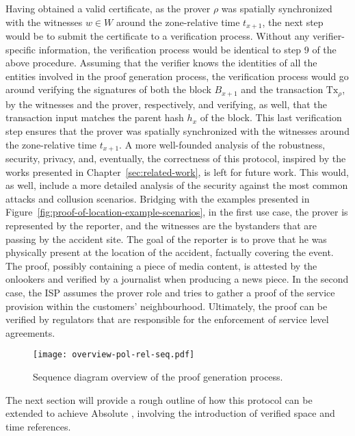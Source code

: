 Having obtained a valid \pol{} certificate, as the prover $\rho$ was spatially synchronized with the witnesses $w \in W$ around the zone-relative time $t_{x+1}$, the next step would be to submit the certificate to a verification process. Without any verifier-specific information, the verification process would be identical to step 9 of the above procedure. Assuming that the verifier knows the identities of all the entities involved in the proof generation process, the verification process would go around verifying the signatures of both the block $B_{x+1}$ and the transaction $\text{Tx}_\rho$, by the witnesses and the prover, respectively, and verifying, as well, that the transaction input matches the parent hash $h_{x}$ of the block. This last verification step ensures that the prover was spatially synchronized with the witnesses around the zone-relative time $t_{x+1}$. A more well-founded analysis of the robustness, security, privacy, and, eventually, the correctness of this \pol{} protocol, inspired by the works presented in Chapter~\ref{sec:related-work}, is left for future work. This would, as well, include a more detailed analysis of the security against the most common attacks and collusion scenarios. Bridging with the examples presented in Figure~\ref{fig:proof-of-location-example-scenarios}, in the first use case, the prover is represented by the reporter, and the witnesses are the bystanders that are passing by the accident site. The goal of the reporter is to prove that he was physically present at the location of the accident, factually covering the event. The proof, possibly containing a piece of media content, is attested by the onlookers and verified by a journalist when producing a news piece. In the second case, the ISP assumes the prover role and tries to gather a proof of the service provision within the customers' neighbourhood. Ultimately, the proof can be verified by regulators that are responsible for the enforcement of service level agreements.

\newpage  

\begin{figure}[h!]
    \begin{center}
    \texttt{[image: overview-pol-rel-seq.pdf]}
    \caption{Sequence diagram overview of the proof generation process.}
    \label{fig:proof-of-location-overview-relative-pol-seq}
    \end{center}
\end{figure}

The next section will provide a rough outline of how this protocol can be extended to achieve Absolute \pol{}, involving the introduction of verified space and time references.